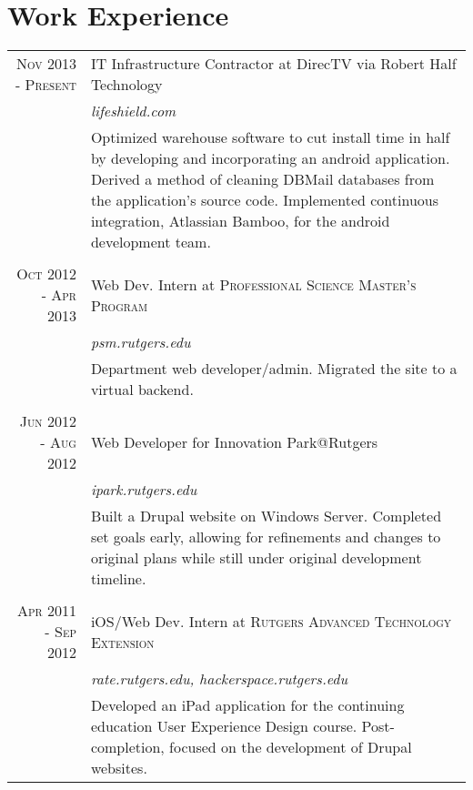 \documentclass[a4paper,10pt, onepage]{article} %
\begin{document}
\section{Work Experience}
\begin{tabular}{r|p{10cm}}
\textsc{Nov 2013 - Present} & {IT Infrastructure Contractor at DirecTV via Robert Half Technology}\\
&\small\emph{lifeshield.com}\\
&\footnotesize{Optimized warehouse software to cut install time in half by developing and incorporating an android application. Derived a method of cleaning DBMail databases from the application's source code. Implemented continuous integration, Atlassian Bamboo, for the android development team.}\\
\multicolumn{2}{c}{}\\

\textsc{Oct 2012 - Apr 2013} & Web Dev. Intern at \textsc{Professional Science Master's Program}\\
& \small\emph{psm.rutgers.edu}\\
& \footnotesize{Department web developer/admin. Migrated the site to a virtual backend.}\\
\multicolumn{2}{c}{} \\


\textsc{Jun 2012 - Aug 2012} & Web Developer for Innovation Park@Rutgers\\
& \small\emph{ipark.rutgers.edu}\\
& \footnotesize{Built a Drupal website on Windows Server. Completed set goals early, allowing for refinements and changes to original plans while still under original development timeline.}\\
\multicolumn{2}{c}{}\\


\textsc{Apr 2011 - Sep 2012} & iOS/Web Dev. Intern at \textsc{Rutgers Advanced Technology Extension}\\
& \small\emph{rate.rutgers.edu, hackerspace.rutgers.edu}\\
& \footnotesize{Developed an iPad application for the continuing education User Experience Design course. Post-completion, focused on the development of Drupal websites.}
\end{tabular}

\end{document}
